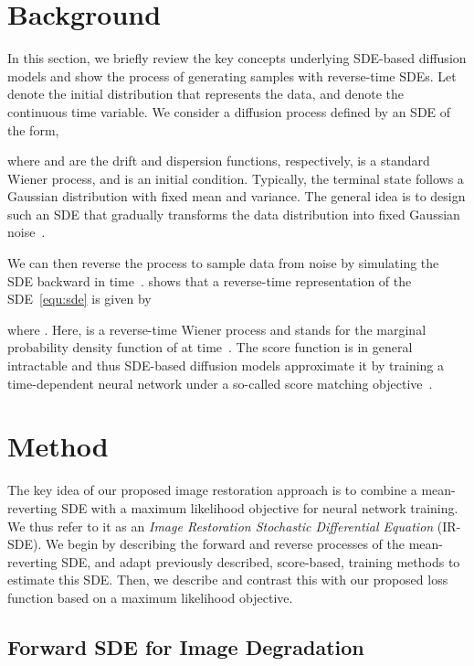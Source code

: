 \documentclass{article}
\theoremstyle{plain}
\theoremstyle{definition}
\theoremstyle{remark}
\begin{document}
%
 \section{Background}
\label{section:background}

In this section, we briefly review the key concepts underlying SDE-based diffusion models and show the process of generating samples with reverse-time SDEs.
Let  denote the initial distribution that represents the data, and  denote the continuous time variable. We consider a diffusion process  defined by an SDE of the form,

where  and  are the drift and dispersion functions, respectively,  is a standard Wiener process, and  is an initial condition. Typically, the terminal state  follows a Gaussian distribution with fixed mean and variance. The general idea is to design such an SDE that gradually transforms the data distribution into fixed Gaussian noise~\citep{song2021score,lu2022dpm,de2022riemannian}.


We can then reverse the process to sample data from noise by simulating the SDE backward in time~\citep{song2021score}. \citet{anderson1982reverse} shows that a reverse-time representation of the SDE~\eqref{equ:sde} is given by

where . Here,  is a reverse-time Wiener process and  stands for the marginal probability density function of  at time~. The score function  is in general intractable and thus SDE-based diffusion models approximate it by training a time-dependent neural network  under a so-called score matching objective~\citep{hyvarinen2005estimation,song2021score}.

 \section{Method}
\label{section:method}

The key idea of our proposed image restoration approach is to combine a mean-reverting SDE with a maximum likelihood objective for neural network training. We thus refer to it as an \emph{Image Restoration Stochastic Differential Equation} (IR-SDE). We begin by describing the forward and reverse processes of the mean-reverting SDE, and adapt previously described, score-based, training methods to estimate this SDE. Then, we describe and contrast this with our proposed loss function based on a maximum likelihood objective.




\subsection{Forward SDE for Image Degradation}
\end{document}
